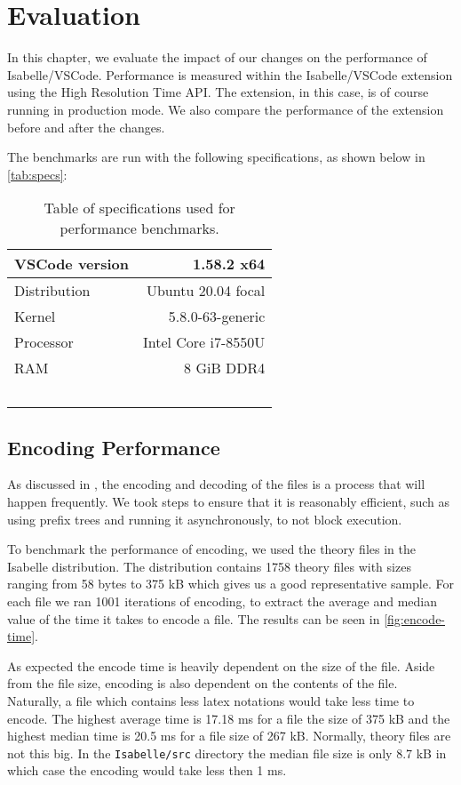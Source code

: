 
\chapter{Evaluation}
\label{chapter:evaluation}
In this chapter, we evaluate the impact of our changes on the performance of Isabelle/VSCode. Performance is measured within the Isabelle/VSCode extension using the High Resolution Time API. The extension, in this case, is of course running in production mode. We also compare the performance of the extension before and after the changes.

The benchmarks are run with the following specifications, as shown below in \autoref{tab:specs}:
\begin{table}[h]
  \centering
  \begin{tabular}{l r}
    VSCode version &  1.58.2  x64\\ \hline
    Distribution & Ubuntu 20.04 focal\\ \hline
    Kernel & 5.8.0-63-generic\\ \hline
    Processor & Intel Core i7-8550U\\ \hline
    RAM & 8 GiB  DDR4\\\
  \end{tabular}
  \caption{Table of specifications used for performance benchmarks.}
  \label{tab:specs}
\end{table}

\section{Encoding Performance}
\label{section:encoding}
As discussed in , the encoding and decoding of the files is a process that will happen frequently. We took steps to ensure that it is reasonably efficient, such as using prefix trees and running it asynchronously, to not block execution.

To benchmark the performance of encoding, we used the theory files in the Isabelle distribution. The distribution contains 1758 theory files with sizes ranging from 58 bytes to 375 kB which gives us a good representative sample. For each file we ran 1001 iterations of encoding, to extract the average and median value of the time it takes to encode a file. The results can be seen in \autoref{fig:encode-time}. 

As expected the encode time is heavily dependent on the size of the file. Aside from the file size, encoding is also dependent on the contents of the file. Naturally, a file which contains less latex notations would take less time to encode. The highest average time is 17.18 ms for a file the size of 375 kB and the highest median time is 20.5 ms for a file size of 267 kB. Normally, theory files are not this big. In the \texttt{Isabelle/src} directory the median file size is only 8.7 kB in which case the encoding would take less then 1 ms.

